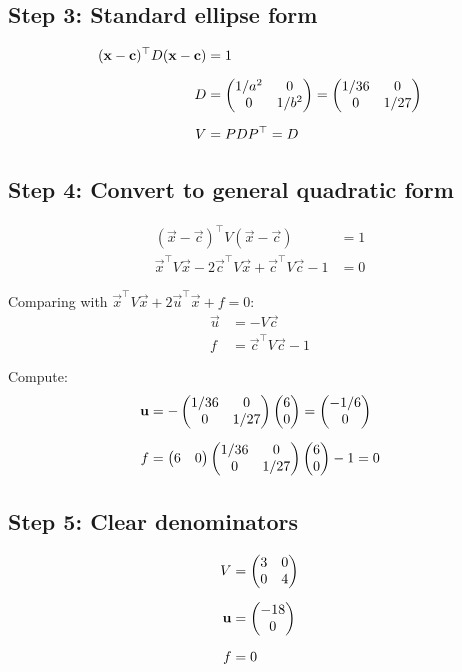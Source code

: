 \documentclass[12pt]{article}
\begin{document}
\subsection*{Step 3: Standard ellipse form}
\begin{align}
(\mathbf{x}-\mathbf{c})^\top D (\mathbf{x}-\mathbf{c}) &= 1 \\[6pt]
D &= \begin{pmatrix}1/a^2 & 0 \\ 0 & 1/b^2\end{pmatrix} 
= \begin{pmatrix}1/36 & 0 \\ 0 & 1/27\end{pmatrix} \\[6pt]
V &= P D P^\top = D
\end{align}

\subsection*{Step 4: Convert to general quadratic form}
\begin{align}
(\vec{x}-\vec{c})^\top V (\vec{x}-\vec{c}) &= 1 \\[6pt]
\vec{x}^\top V \vec{x} - 2 \vec{c}^\top V \vec{x} + \vec{c}^\top V \vec{c} - 1 &= 0
\end{align}

Comparing with $\vec{x}^\top V \vec{x} + 2 \vec{u}^\top \vec{x} + f = 0$:
\begin{align}
\vec{u} &= -V\vec{c} \\[6pt]
f &= \vec{c}^\top V \vec{c} - 1
\end{align}

Compute:
\begin{align}
\mathbf{u} &= -\begin{pmatrix}1/36 & 0 \\ 0 & 1/27\end{pmatrix}\begin{pmatrix}6\\0\end{pmatrix} 
= \begin{pmatrix}-1/6\\0\end{pmatrix} \\[6pt]
f &= \begin{pmatrix}6 & 0\end{pmatrix}\begin{pmatrix}1/36 & 0 \\ 0 & 1/27\end{pmatrix}\begin{pmatrix}6\\0\end{pmatrix} - 1 = 0
\end{align}

\subsection*{Step 5: Clear denominators}
\begin{align}
V &= \begin{pmatrix}3 & 0 \\ 0 & 4\end{pmatrix} \\[6pt]
\mathbf{u} &= \begin{pmatrix}-18 \\ 0\end{pmatrix} \\[6pt]
f &= 0
\end{align}
\end{document}
